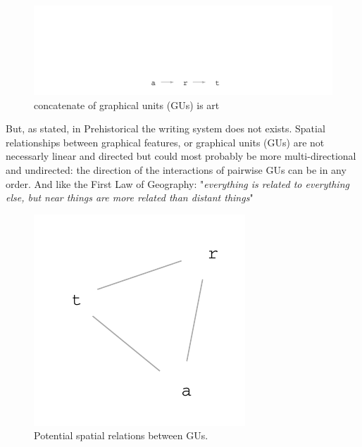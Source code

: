 \documentclass[article]{jss}\usepackage{knitr}
\begin{document}
\begin{figure}[H]

{\centering \includegraphics[width=\maxwidth]{figure/unnamed-chunk-1-1} 

}

\caption{\label{fig:figs}concatenate of graphical units (GUs) is art}\label{fig:unnamed-chunk-1}
\end{figure}



But, as stated, in Prehistorical the writing system does not exists. Spatial relationships between graphical features, or graphical units (GUs) are not necessarly linear and directed but could most probably be more multi-directional and undirected: the direction of the interactions of pairwise GUs can be in any order. And like the First Law of Geography: "\emph{everything is related to everything else, but near things are more related than distant things}" \citep{Tobler70}

\begin{figure}[H]

{\centering \includegraphics[width=\maxwidth]{figure/unnamed-chunk-2-1} 

}

\caption{\label{fig:figs}Potential spatial relations between GUs.}\label{fig:unnamed-chunk-2}
\end{figure}
\end{document}
